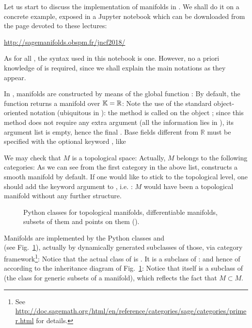 Let us start to discuss the implementation of manifolds in \Sage{}. We shall
do it on a concrete example, exposed in a Jupyter notebook which can be downloaded
from the page devoted to these lectures:
\begin{center}
\url{http://sagemanifolds.obspm.fr/jncf2018/}
\end{center}
As for all \Sage{}, the syntax used in this notebook is  one. However, no
a priori knowledge of  is required, since we shall explain the
main notations as they appear.

In \Sage{}, manifolds are constructed by means of the global function :
By default, the function  returns a manifold over $\mathbb{K}=\mathbb{R}$:
Note the use of the standard object-oriented notation (ubiquitous in
): the method  is called on the object ;
since this method does not require any extra argument (all the information lies
in ), its argument list is empty, hence the final \code{()}.
Base fields different from $\mathbb{R}$
must be specified with the optional keyword , like
\begin{flushleft}
\end{flushleft}
We may check that $M$ is a topological space:
Actually, $M$ belongs to the following categories:
As we can see from the first category in the above list, 
constructs a smooth manifold by default.
If one would like to stick to the topological level, one should add
the keyword argument  to ,
i.e. : $M$ would have
been a topological manifold without any further structure.

\begin{figure}
\begin{center}

\end{center}
\caption{\label{f:man:domain_classes}\footnotesize
Python classes for topological
manifolds, differentiable manifolds, subsets of them
and points on them ().}
\end{figure}


Manifolds are implemented by the Python classes 
and \\  (see Fig.~\ref{f:man:domain_classes}),
actually by dynamically generated subclasses of those, via \Sage{} category
framework\footnote{See \url{http://doc.sagemath.org/html/en/reference/categories/sage/categories/primer.html} for details.}:
Notice that the actual class of  is .
It is a subclass of :
and hence of
 according to the inheritance diagram of Fig.~\ref{f:man:domain_classes}:
Notice that  itself is a subclass of  (the class
for generic subsets of a manifold), which reflects the fact that $M\subset M$.


